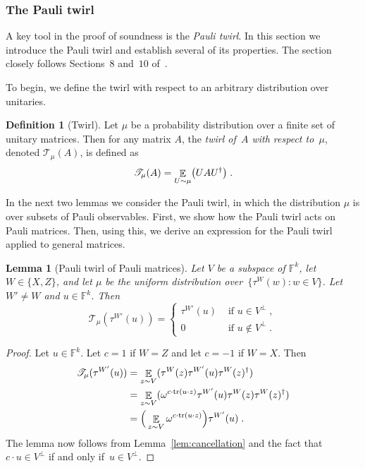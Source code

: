 \documentclass[11pt]{article}
\newtheorem{lemma}[theorem]{Lemma}
\theoremstyle{definition}
\newtheorem{definition}[theorem]{Definition}
\newcommand{\F}{\ensuremath{\mathbb{F}}}
\DeclareMathOperator{\tr}{tr}
\newcommand{\E}{\mathop{\mathbb{E}}\displaylimits}
\begin{document}
\subsubsection{The Pauli twirl}

A key tool in the proof of soundness is the \emph{Pauli twirl}.
In this section we introduce the Pauli twirl and establish several of its
properties.
The section closely follows Sections~$8$ and~$10$ of~\cite{NW19}. 

To begin, we define the twirl with respect to an arbitrary distribution over
unitaries.

\begin{definition}[Twirl]
  \label{def:mixing}
  Let $\mu$ be a probability distribution over a finite set of unitary matrices.
  Then for any matrix $A$, the \emph{twirl of~$A$ with respect to~$\mu$},
  denoted $\mathscr{T}_\mu(A)$, is defined as
  \begin{equation*}
    \mathscr{T}_\mu (A) = \E_{U \sim \mu} \bigl( U A U^\dagger \bigr)\;.
  \end{equation*}
\end{definition}

In the next two lemmas we consider the Pauli twirl, in which the distribution
$\mu$ is over subsets of Pauli observables.
First, we show how the Pauli twirl acts on Pauli matrices.
Then, using this, we derive an expression for the Pauli twirl applied to general
matrices.

\begin{lemma}[Pauli twirl of Pauli matrices]
  \label{lem:twirl-pauli}
  Let $V$ be a subspace of $\F^k$, let $W \in \{X, Z\}$, and let $\mu$ be the
  uniform distribution over~$\{\tau^W(w) : w \in V\}$.
  Let $W'\neq W$ and $u\in \F^k$.
  Then
  \begin{equation*}
    \mathscr{T}_\mu(\tau^{W'}(u)) =
    \begin{cases}
      \tau^{W'}(u)&\text{ if }u \in V^{\perp}\;,\\
      0 &\text{ if }u \notin V^{\perp}\;.
    \end{cases}
  \end{equation*}
\end{lemma}

\begin{proof}
  Let $u\in \F^k$.
  Let $c = 1$ if $W = Z$ and let $c = -1$ if $W = X$.
  Then
  \begin{align*}
    \mathscr{T}_\mu(\tau^{W'}(u))
    &= \E_{z \sim V} (\tau^W(z)  \tau^{W'}(u) \tau^W(z)^\dagger)\\
    &= \E_{z \sim V} (\omega^{c\cdot \tr(u \cdot z)} \tau^{W'}(u) \tau^W(z)
      \tau^W(z)^\dagger)\\
    &= \Big(\E_{z \sim V} \omega^{c\cdot \tr(u \cdot z)}\Big) \tau^{W'}(u)\;.
  \end{align*}
  The lemma now follows from Lemma~\ref{lem:cancellation}
  and the fact that $c \cdot u \in V^\perp$ if and only if~$u\in V^\perp$.
\end{proof}
\end{document}
